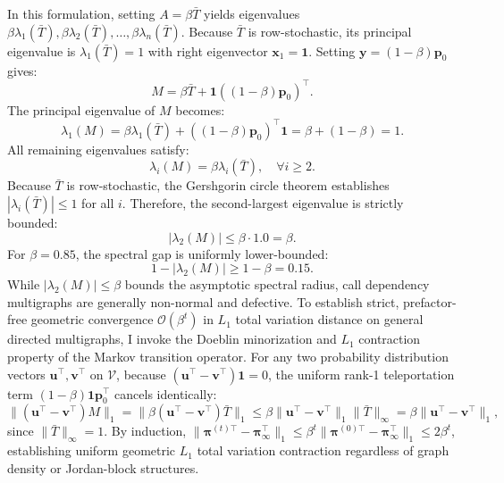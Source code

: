 \documentclass[10pt]{article}
\begin{document}
In this formulation, setting $A = \beta \bar{T}$ yields eigenvalues $\beta \lambda_1(\bar{T}), \beta \lambda_2(\bar{T}), \dots, \beta \lambda_n(\bar{T})$. Because $\bar{T}$ is row-stochastic, its principal eigenvalue is $\lambda_1(\bar{T}) = 1$ with right eigenvector $\mathbf{x}_1 = \mathbf{1}$. Setting $\mathbf{y} = (1 - \beta) \mathbf{p}_0$ gives:
\begin{equation}
M = \beta \bar{T} + \mathbf{1} ((1 - \beta) \mathbf{p}_0)^\top.
\end{equation}
The principal eigenvalue of $M$ becomes:
\begin{equation}
\lambda_1(M) = \beta \lambda_1(\bar{T}) + ((1 - \beta) \mathbf{p}_0)^\top \mathbf{1} = \beta + (1 - \beta) = 1.
\end{equation}
All remaining eigenvalues satisfy:
\begin{equation}
\lambda_i(M) = \beta \lambda_i(\bar{T}), \quad \forall i \ge 2.
\end{equation}
Because $\bar{T}$ is row-stochastic, the Gershgorin circle theorem establishes $|\lambda_i(\bar{T})| \le 1$ for all $i$. Therefore, the second-largest eigenvalue is strictly bounded:
\begin{equation}
|\lambda_2(M)| \le \beta \cdot 1.0 = \beta.
\end{equation}
For $\beta = 0.85$, the spectral gap is uniformly lower-bounded:
\begin{equation}
1 - |\lambda_2(M)| \ge 1 - \beta = 0.15.
\end{equation}
While $|\lambda_2(M)| \le \beta$ bounds the asymptotic spectral radius, call dependency multigraphs are generally non-normal and defective. To establish strict, prefactor-free geometric convergence $\mathcal{O}(\beta^t)$ in $L_1$ total variation distance on general directed multigraphs, I invoke the Doeblin minorization and $L_1$ contraction property of the Markov transition operator. For any two probability distribution vectors $\mathbf{u}^\top, \mathbf{v}^\top$ on $\mathcal{V}$, because $(\mathbf{u}^\top - \mathbf{v}^\top)\mathbf{1} = 0$, the uniform rank-1 teleportation term $(1-\beta)\mathbf{1}\mathbf{p}_0^\top$ cancels identically:
\begin{equation}
\|(\mathbf{u}^\top - \mathbf{v}^\top) M\|_1 = \|\beta (\mathbf{u}^\top - \mathbf{v}^\top) \bar{T}\|_1 \le \beta \|\mathbf{u}^\top - \mathbf{v}^\top\|_1 \|\bar{T}\|_\infty = \beta \|\mathbf{u}^\top - \mathbf{v}^\top\|_1,
\end{equation}
since $\|\bar{T}\|_\infty = 1$. By induction, $\|\boldsymbol{\pi}^{(t)\top} - \boldsymbol{\pi}_\infty^\top\|_1 \le \beta^t \|\boldsymbol{\pi}^{(0)\top} - \boldsymbol{\pi}_\infty^\top\|_1 \le 2\beta^t$, establishing uniform geometric $L_1$ total variation contraction regardless of graph density or Jordan-block structures.
\end{document}
